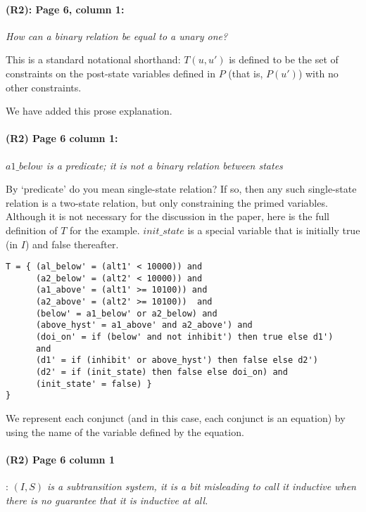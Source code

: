 \documentclass{article}
\begin{document}
\paragraph{(R2): Page 6, column 1:} \textit{How can a binary relation be equal to a unary
one?}
\vspace{0.05in}

\noindent This is a standard notational shorthand: $T(u, u')$ is defined to be the set of constraints on the post-state variables defined in $P$ (that
is, $P(u')$) with no other constraints.

We have added this prose explanation.

\paragraph{(R2) Page 6 column 1:} \textit{$a1\_below$ is a predicate; it is not a binary
relation between states}
\vspace{0.05in}

\noindent By `predicate' do you mean single-state relation? If so, then
any such single-state relation is a two-state relation, but only constraining the primed variables.  Although it is not necessary for the discussion in the paper, here is the
full definition of $T$ for the example. $init\_state$ is a special
variable that is initially true (in $I$) and false thereafter.

\begin{verbatim}
T = { (al_below' = (alt1' < 10000)) and
      (a2_below' = (alt2' < 10000)) and
      (a1_above' = (alt1' >= 10100)) and
      (a2_above' = (alt2' >= 10100))  and
      (below' = a1_below' or a2_below) and
      (above_hyst' = a1_above' and a2_above') and
      (doi_on' = if (below' and not inhibit') then true else d1')
      and
      (d1' = if (inhibit' or above_hyst') then false else d2')
      (d2' = if (init_state) then false else doi_on) and
      (init_state' = false) }
}
\end{verbatim}

We represent each conjunct (and in this case, each conjunct is an equation) by using the name of the variable defined by the equation.

\paragraph{(R2) Page 6 column 1}: \textit{$(I, S)$ is a subtransition system, it is a bit
misleading to call it inductive when there is no guarantee that it
is inductive at all.}
\vspace{0.05in}
\end{document}

